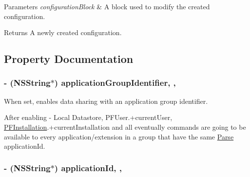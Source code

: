 \begin{DoxyParams}{Parameters}
{\em configuration\+Block} & A block used to modify the created configuration.\\
\hline
\end{DoxyParams}
\begin{DoxyReturn}{Returns}
A newly created configuration. 
\end{DoxyReturn}


\subsection{Property Documentation}
\hypertarget{interface_parse_client_configuration_a7c2a0563d18d9a6f692574b7c74f46d7}{}
\subsubsection[{application\+Group\+Identifier}]{\setlength{\rightskip}{0pt plus 5cm}-\/ (N\+S\+String$\ast$) application\+Group\+Identifier\hspace{0.3cm}{\ttfamily [read]}, {\ttfamily [nonatomic]}, {\ttfamily [copy]}}\label{interface_parse_client_configuration_a7c2a0563d18d9a6f692574b7c74f46d7}




 





When set, enables data sharing with an application group identifier.

After enabling -\/ Local Datastore, {\ttfamily P\+F\+User.+current\+User}, {\ttfamily \hyperlink{interface_p_f_installation}{P\+F\+Installation}.+current\+Installation} and all eventually commands are going to be available to every application/extension in a group that have the same \hyperlink{interface_parse}{Parse} application\+Id. \hypertarget{interface_parse_client_configuration_a5d59beec752cc3904589557beaf3d1ed}{}
\subsubsection[{application\+Id}]{\setlength{\rightskip}{0pt plus 5cm}-\/ (N\+S\+String$\ast$) application\+Id\hspace{0.3cm}{\ttfamily [read]}, {\ttfamily [nonatomic]}, {\ttfamily [copy]}}\label{interface_parse_client_configuration_a5d59beec752cc3904589557beaf3d1ed}




